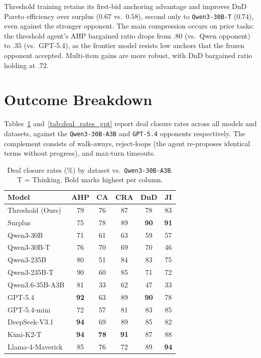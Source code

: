 \documentclass[11pt]{article}
\newcommand{\model}[1]{\texttt{#1}}
\newcommand{\lightrule}{\arrayrulecolor{black!20}\midrule\arrayrulecolor{black}}
\begin{document}
Threshold training retains its first-bid anchoring advantage and improves DnD Pareto efficiency over surplus ($0.67$ vs.\ $0.58$), second only to \model{Qwen3-30B-T} ($0.74$), even against the stronger opponent. The main compression occurs on price tasks: the threshold agent's AHP bargained ratio drops from $.80$ (vs.\ Qwen opponent) to $.35$ (vs.\ GPT-5.4), as the frontier model resists low anchors that the frozen opponent accepted. Multi-item gains are more robust, with DnD bargained ratio holding at $.72$.

\section{Outcome Breakdown}
\label{app:outcomes}

Tables~\ref{tab:deal_rates_qwen} and~\ref{tab:deal_rates_gpt} report deal closure rates across all models and datasets, against the \model{Qwen3-30B-A3B} and \model{GPT-5.4} opponents respectively. The complement consists of walk-aways, reject-loops (the agent re-proposes identical terms without progress), and max-turn timeouts.

\begin{table}[ht]
\centering
\scriptsize
\setlength{\tabcolsep}{4pt}
\renewcommand{\arraystretch}{1.15}
\begin{tabular}{l ccccc}
\toprule
\rowcolor{tableheader}
\textbf{Model} & \textbf{AHP} & \textbf{CA} & \textbf{CRA} & \textbf{DnD} & \textbf{JI} \\
\midrule
\rowcolor{tablerow}
Threshold (Ours) & 79 & 76 & 87 & 78 & 83 \\
Surplus          & 75 & 78 & 89 & \textbf{90} & \textbf{91} \\
\lightrule
\rowcolor{tablerow}
Qwen3-30B        & 71 & 61 & 63 & 59 & 57 \\
Qwen3-30B-T      & 76 & 70 & 69 & 70 & 46 \\
\rowcolor{tablerow}
Qwen3-235B       & 80 & 51 & 84 & 83 & 75 \\
Qwen3-235B-T     & 90 & 60 & 85 & 71 & 72 \\
\rowcolor{tablerow}
Qwen3.6-35B-A3B  & 81 & 33 & 62 & 47 & 33 \\
GPT-5.4          & \textbf{92} & 63 & 89 & \textbf{90} & 78 \\
\rowcolor{tablerow}
GPT-5.4-mini     & 72 & 57 & 81 & 83 & 85 \\
DeepSeek-V3.1    & \textbf{94} & 69 & 89 & 85 & 82 \\
\rowcolor{tablerow}
Kimi-K2-T        & \textbf{94} & \textbf{78} & \textbf{91} & 87 & 88 \\
Llama-4-Maverick & 85 & 76 & 72 & 89 & \textbf{94} \\
\bottomrule
\end{tabular}
\caption{Deal closure rates (\%) by dataset vs.\ \model{Qwen3-30B-A3B}. T = Thinking. Bold marks highest per column.}
\label{tab:deal_rates_qwen}
\end{table}
\end{document}
